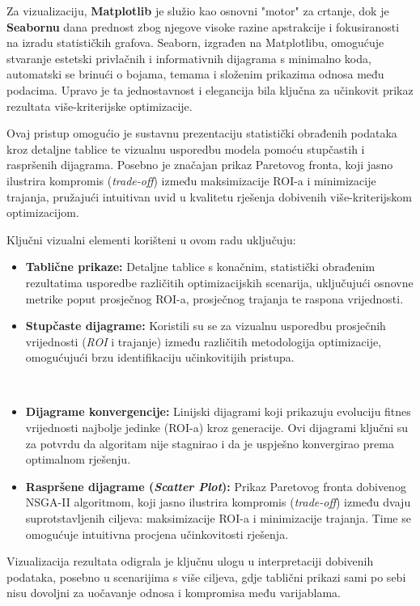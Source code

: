 Za vizualizaciju, \textbf{Matplotlib} je služio kao osnovni "motor" za crtanje, dok je \textbf{Seabornu} dana prednost zbog njegove visoke razine apstrakcije i fokusiranosti na izradu statističkih grafova. Seaborn, izgrađen na Matplotlibu, omogućuje stvaranje estetski privlačnih i informativnih dijagrama s minimalno koda, automatski se brinući o bojama, temama i složenim prikazima odnosa među podacima. Upravo je ta jednostavnost i elegancija bila ključna za učinkovit prikaz rezultata više-kriterijske optimizacije.

Ovaj pristup omogućio je sustavnu prezentaciju statistički obrađenih podataka kroz detaljne tablice te vizualnu usporedbu modela pomoću stupčastih i raspršenih dijagrama. Posebno je značajan prikaz Paretovog fronta, koji jasno ilustrira kompromis (\textit{trade-off}) između maksimizacije ROI-a i minimizacije trajanja, pružajući intuitivan uvid u kvalitetu rješenja dobivenih više-kriterijskom optimizacijom.

Ključni vizualni elementi korišteni u ovom radu uključuju:
\begin{itemize}
    \item \textbf{Tablične prikaze:} Detaljne tablice s konačnim, statistički obrađenim rezultatima usporedbe različitih optimizacijskih scenarija, uključujući osnovne metrike poput prosječnog ROI-a, prosječnog trajanja te raspona vrijednosti.
    \item \textbf{Stupčaste dijagrame:} Koristili su se za vizualnu usporedbu prosječnih vrijednosti (\textit{ROI} i trajanje) između različitih metodologija optimizacije, omogućujući brzu identifikaciju učinkovitijih pristupa.

   \item \textbf{Dijagrame konvergencije:} Linijski dijagrami koji prikazuju evoluciju fitnes vrijednosti najbolje jedinke (ROI-a) kroz generacije. Ovi dijagrami ključni su za potvrdu da algoritam nije stagnirao i da je uspješno konvergirao prema optimalnom rješenju.
    \item \textbf{Raspršene dijagrame (\textit{Scatter Plot}):} Prikaz Paretovog fronta dobivenog NSGA-II algoritmom, koji jasno ilustrira kompromis (\textit{trade-off}) između dvaju suprotstavljenih ciljeva: maksimizacije ROI-a i minimizacije trajanja. Time se omogućuje intuitivna procjena učinkovitosti rješenja.
\end{itemize}

Vizualizacija rezultata odigrala je ključnu ulogu u interpretaciji dobivenih podataka, posebno u scenarijima s više ciljeva, gdje tablični prikazi sami po sebi nisu dovoljni za uočavanje odnosa i kompromisa među varijablama.

